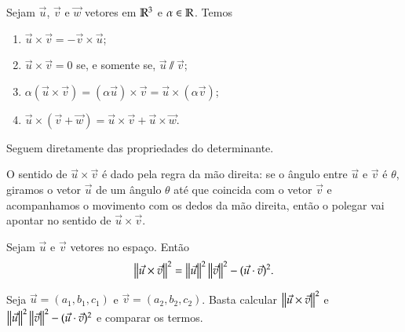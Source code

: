 \begin{proposicao}
  Sejam $\vec{u}$, $\vec{v}$ e $\vec{w}$ vetores em $\mathbb{R}^3$ e $\alpha \in \mathbb{R}$. Temos
  \begin{enumerate}[label=({\alph*})]
    \item $\vec{u}\times\vec{v} = -\vec{v}\times\vec{u}$;
    \item $\vec{u}\times\vec{v} = 0$ se, e somente se, $\vec{u}\varparallel\vec{v}$;
    \item $\alpha(\vec{u}\times\vec{v}) = (\alpha\vec{u})\times\vec{v} = \vec{u}\times(\alpha\vec{v})$;
    \item $\vec{u}\times(\vec{v} + \vec{w}) = \vec{u}\times\vec{v} + \vec{u}\times\vec{w}$.
  \end{enumerate}
\end{proposicao}
\begin{prova}
  Seguem diretamente das propriedades do determinante.
\end{prova}

\begin{observacao}
  O sentido de $\vec{u}\times\vec{v}$ \'e dado pela regra da m\~ao direita: se o \^angulo entre $\vec{u}$ e $\vec{v}$ \'e $\theta$, giramos o vetor $\vec{u}$ de um \^angulo $\theta$ at\'e que coincida com o vetor $\vec{v}$ e acompanhamos o movimento com os dedos da m\~ao direita, ent\~ao o polegar vai apontar no sentido de $\vec{u}\times\vec{v}$.
\end{observacao}

\begin{proposicao}\label{normaprodutovetorial}
  Sejam $\vec{u}$ e $\vec{v}$ vetores no espa\c{c}o. Ent\~ao
  \begin{equation}
    \left\Vert{\vec{u}\times\vec{v}}\right\Vert^2 = \left\Vert{\vec{u}}\right\Vert^2\left\Vert{\vec{v}}\right\Vert^2 - (\vec{u}\cdot\vec{v})^2.
  \end{equation}
\end{proposicao}
\begin{prova}
  Seja $\vec{u} = (a_1,b_1,c_1)$ e $\vec{v} = (a_2,b_2,c_2)$. Basta calcular $\left\Vert{\vec{u}\times\vec{v}}\right\Vert^2$ e $\left\Vert{\vec{u}}\right\Vert^2\left\Vert{\vec{v}}\right\Vert^2 - (\vec{u}\cdot\vec{v})^2$  e comparar os termos.
\end{prova}

